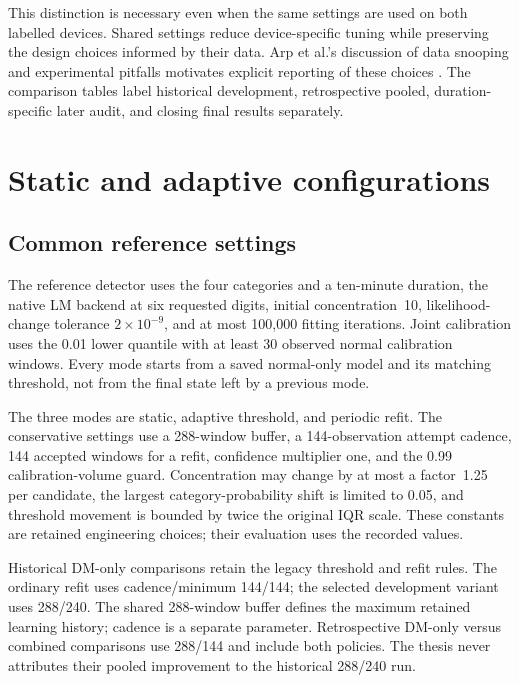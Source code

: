 This distinction is necessary even when the same settings are used on
both labelled devices. Shared settings reduce device-specific tuning
while preserving the design choices informed by their data. Arp et al.'s
discussion of data snooping and experimental pitfalls motivates explicit
reporting of these choices \cite{arp2022}. The comparison tables label
historical development, retrospective pooled, duration-specific later
audit, and closing final results separately.

\section{Static and adaptive configurations}
\label{sec:experimental-configurations}

\subsection{Common reference settings}

The reference detector uses the four categories and a ten-minute duration,
the native LM backend at six requested digits, initial concentration~10,
likelihood-change tolerance $2\times10^{-9}$, and at most 100,000 fitting
iterations. Joint calibration uses the 0.01 lower quantile with at least
30 observed normal calibration windows. Every mode starts from a saved
normal-only model and its matching threshold, not from the final state
left by a previous mode.

The three modes are static, adaptive threshold, and periodic refit.
The conservative settings use a 288-window buffer, a 144-observation
attempt cadence, 144 accepted windows for a refit, confidence multiplier
one, and the 0.99 calibration-volume guard. Concentration may change by
at most a factor~1.25 per candidate, the largest category-probability
shift is limited to 0.05, and threshold movement is bounded by twice the
original IQR scale. These constants are retained engineering choices;
their evaluation uses the recorded values.

Historical DM-only comparisons retain the legacy threshold and refit
rules. The ordinary refit uses cadence/minimum 144/144; the selected
development variant uses 288/240. The shared 288-window buffer defines
the maximum retained learning history; cadence is a separate parameter.
Retrospective DM-only versus combined
comparisons use 288/144 and include both policies. The thesis never
attributes their pooled improvement to the historical 288/240 run.

